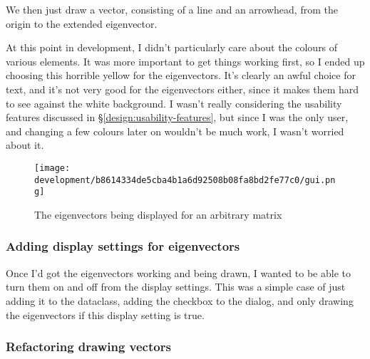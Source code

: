 \documentclass[../development.tex]{subfiles}
\begin{document}
We then just draw a vector, consisting of a line and an arrowhead, from the origin to the extended eigenvector.



At this point in development, I didn't particularly care about the colours of various elements. It was more important to get things working first, so I ended up choosing \textcolor[RGB]{255, 249, 0}{this horrible yellow} for the eigenvectors. It's clearly an awful choice for text, and it's not very good for the eigenvectors either, since it makes them hard to see against the white background. I wasn't really considering the usability features discussed in \S\ref{design:usability-features}, but since I was the only user, and changing a few colours later on wouldn't be much work, I wasn't worried about it.

\begin{figure}[H]
	\centering
	\texttt{[image: development/b8614334de5cba4b1a6d92508b08fa8bd2fe77c0/gui.png]}
	\caption{The eigenvectors being displayed for an arbitrary matrix}
	\label{fig:development:b8614334de5cba4b1a6d92508b08fa8bd2fe77c0:gui.png}
\end{figure}

\subsubsection{Adding display settings for eigenvectors\label{development:implementing-eigenstuffs:adding-display-settings-for-eigenvectors}}

Once I'd got the eigenvectors working and being drawn, I wanted to be able to turn them on and off from the display settings. This was a simple case of just adding it to the  dataclass, adding the checkbox to the dialog, and only drawing the eigenvectors if this display setting is true.




\subsubsection{Refactoring drawing vectors\label{development:implementing-eigenstuffs:refactoring-drawing-vectors}}
\end{document}
